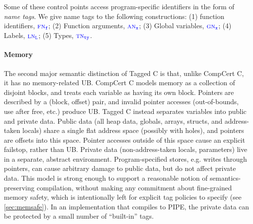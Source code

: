\documentclass{llncs}
\begin{document}
Some of these control points access program-specific identifiers in the form of
{\em name tags}. We give name tags to the following constructions:
(1) function identifiers, \({\color{blue} \textnormal{\sc fn}_{\mathtt{f}}}\); (2) Function arguments, \({\color{blue} \textnormal{\sc an}_{\mathtt{x}}}\); (3) Global variables, \({\color{blue} \textnormal{\sc gn}_{\mathtt{x}}}\);
(4) Labels, \({\color{blue} \textnormal{\sc ln}_{\mathtt{L}}}\); (5) Types, \({\color{blue} \textnormal{\sc tn}_{\mathtt{ty}}}\).

\paragraph*{Memory} The second major semantic distinction of Tagged C is that, unlike CompCert C,
it has no memory-related UB. CompCert C models memory as a collection of disjoint blocks,
and treats each variable as having its own block. Pointers are described by a (block, offset) pair,
and invalid pointer accesses (out-of-bounds, use after free, etc.) produce UB.
Tagged C instead separates variables
into public and private data. Public data (all heap data, globals, arrays, structs, and
address-taken locals) share a single flat address space (possibly with holes), and pointers are
offsets into this space. Pointer accesses outside of this space cause
an explicit failstop, rather than UB. 
Private data (non-address-taken locals, parameters) live in a separate, abstract environment.
Program-specified stores, e.g. writes through pointers, can cause arbitrary damage to public
data, but do not affect private data. 
This model is strong enough to support a reasonable
notion of semantics-preserving compilation, without making any commitment about fine-grained
memory safety, which is intentionally left for explicit tag policies to specify (see \cref{sec:memsafe}).
In an implementation that compiles to PIPE, the private data can be protected by a small number of
``built-in'' tags.


\end{document}
